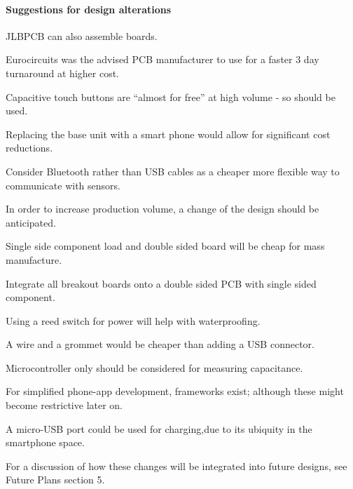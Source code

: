 \paragraph{Suggestions for design alterations}   
\begin{arrowlist}
  \item JLBPCB can also assemble boards.
  \item Eurocircuits was the advised PCB manufacturer to use for a faster 3 day turnaround at higher cost. 
\item Capacitive touch buttons are \enquote{almost for free} at high volume - so should be used.
\item Replacing the base unit with a smart phone would allow for significant cost reductions.
\item Consider Bluetooth rather than USB cables as a cheaper more flexible way to communicate with sensors.
\item In order to increase production volume, a change of the design should be anticipated.
\item Single side component load and double sided board will be cheap for mass manufacture.
\item Integrate all breakout boards onto a double sided PCB with single sided component. %
\item Using a reed switch for power will help with waterproofing.
\item A wire and a grommet would be cheaper than adding a USB connector.
\item Microcontroller only should be considered for measuring capacitance.
\item For simplified phone-app development, frameworks exist; although these might become restrictive later on.
\item A micro-USB port could be used for charging,due to its ubiquity in the smartphone space.

\end{arrowlist}
  
For a discussion of how these changes will be integrated into future designs, see Future Plans section 5. 
  
   
   
